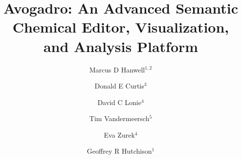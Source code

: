 \documentclass[10pt]{bmc_article}
\newenvironment{bmcformat}{\begin{raggedright}
  \baselineskip20pt\sloppy\setboolean{publ}{false}}{\end{raggedright}
  \baselineskip20pt\sloppy}
\begin{document}
\begin{bmcformat}



\title{Avogadro: An Advanced Semantic Chemical Editor, Visualization, and
  Analysis Platform}

\author{Marcus D Hanwell\correspondingauthor$^{1, 2}$%
  \and
  Donald E Curtis$^3$%
  \and
  David C Lonie$^4$%
  \and
  Tim Vandermeersch$^5$%
  \and
  Eva Zurek$^4$%
  \and
  Geoffrey R Hutchison$^1$%
  }


\address{%
  \iid(1)Department of Chemistry, University of Pittsburgh, 219 Parkman Avenue,
Pittsburgh, PA, 15260, USA\\
  \iid(2)Department of Scientific Computing, Kitware, Inc., 28 Corporate Drive,
Clifton Park, NY, 12065, USA\\
  \iid(3)Department of Computer Science, Coe College, 1220 First Avenue NE,
Cedar Rapids, Iowa 52402\\
  \iid(4)Department of Chemistry, State University of New York at Buffalo,
Buffalo, New York 14260-3000\\
  \iid(5)Avogadro development team
}%

\maketitle


\end{bmcformat}
\end{document}

